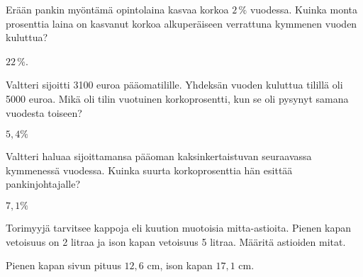 \begin{tehtavasivu}
\begin{tehtava}
\begin{alakohdat}
\end{alakohdat}
\begin{vastaus}
\begin{alakohdat}
\end{alakohdat}
\end{vastaus}
\end{tehtava}

\begin{tehtava}
    Erään pankin myöntämä opintolaina kasvaa korkoa $2\,\%$ vuodessa. Kuinka monta 
    prosenttia laina on kasvanut korkoa alkuperäiseen verrattuna kymmenen vuoden kuluttua?
    \begin{vastaus}
        $22\,\%$.
    \end{vastaus}
\end{tehtava}

\begin{tehtava}%
Valtteri sijoitti 3100 euroa pääomatilille. Yhdeksän vuoden kuluttua tilillä oli 5000 euroa. Mikä oli tilin vuotuinen korkoprosentti, kun se oli pysynyt samana vuodesta toiseen? 
\begin{vastaus}
$5,4\%$
\end{vastaus}
\end{tehtava}
\begin{tehtava}%
Valtteri haluaa sijoittamansa pääoman kaksinkertaistuvan seuraavassa kymmenessä vuodessa. Kuinka suurta korkoprosenttia hän esittää pankinjohtajalle?
\begin{vastaus}
$7,1\%$
\end{vastaus}
\end{tehtava}

\begin{tehtava}%
Torimyyjä tarvitsee kappoja eli kuution muotoisia mitta-astioita. Pienen kapan vetoisuus on 2 litraa ja ison kapan vetoisuus 5 litraa. Määritä astioiden mitat.
\begin{vastaus}
Pienen kapan sivun pituus $12,6$ cm, ison kapan $17,1$ cm. 
\end{vastaus}
\end{tehtava}


\end{tehtavasivu}
